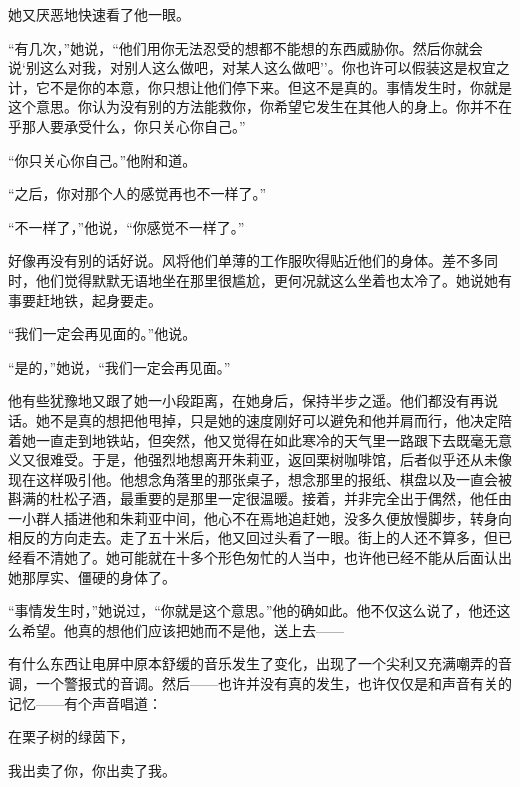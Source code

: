她又厌恶地快速看了他一眼。

``有几次，''她说，``他们用你无法忍受的想都不能想的东西威胁你。然后你就会说`别这么对我，对别人这么做吧，对某人这么做吧''。你也许可以假装这是权宜之计，它不是你的本意，你只想让他们停下来。但这不是真的。事情发生时，你就是这个意思。你认为没有别的方法能救你，你希望它发生在其他人的身上。你并不在乎那人要承受什么，你只关心你自己。''

``你只关心你自己。''他附和道。

``之后，你对那个人的感觉再也不一样了。''

``不一样了，''他说，``你感觉不一样了。''

好像再没有别的话好说。风将他们单薄的工作服吹得贴近他们的身体。差不多同时，他们觉得默默无语地坐在那里很尴尬，更何况就这么坐着也太冷了。她说她有事要赶地铁，起身要走。

``我们一定会再见面的。''他说。

``是的，''她说，``我们一定会再见面。''

他有些犹豫地又跟了她一小段距离，在她身后，保持半步之遥。他们都没有再说话。她不是真的想把他甩掉，只是她的速度刚好可以避免和他并肩而行，他决定陪着她一直走到地铁站，但突然，他又觉得在如此寒冷的天气里一路跟下去既毫无意义又很难受。于是，他强烈地想离开朱莉亚，返回栗树咖啡馆，后者似乎还从未像现在这样吸引他。他想念角落里的那张桌子，想念那里的报纸、棋盘以及一直会被斟满的杜松子酒，最重要的是那里一定很温暖。接着，并非完全出于偶然，他任由一小群人插进他和朱莉亚中间，他心不在焉地追赶她，没多久便放慢脚步，转身向相反的方向走去。走了五十米后，他又回过头看了一眼。街上的人还不算多，但已经看不清她了。她可能就在十多个形色匆忙的人当中，也许他已经不能从后面认出她那厚实、僵硬的身体了。

``事情发生时，''她说过，``你就是这个意思。''他的确如此。他不仅这么说了，他还这么希望。他真的想他们应该把她而不是他，送上去——

有什么东西让电屏中原本舒缓的音乐发生了变化，出现了一个尖利又充满嘲弄的音调，一个警报式的音调。然后——也许并没有真的发生，也许仅仅是和声音有关的记忆——有个声音唱道：

在栗子树的绿茵下，

我出卖了你，你出卖了我。

